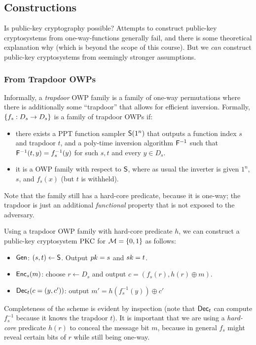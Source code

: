 \documentclass[11pt]{article}
\begin{document}
\subsection{Constructions}
\label{sec:constructions}

Is public-key cryptography possible?  Attempts to construct public-key
cryptosystems from one-way-functions generally fail, and there is some
theoretical explanation why (which is beyond the scope of this
course).  But we \emph{can} construct public-key cryptosystems from
seemingly stronger assumptions.

\subsubsection{From Trapdoor OWPs}
\label{sec:from-trapdoor-owps}

Informally, a \emph{trapdoor} OWP family is a family of one-way
permutations where there is additionally some ``trapdoor'' that allows
for efficient inversion.  Formally, $\{f_{s}: D_{s} \to D_{s}\}$ is a
family of trapdoor OWPs if:
\begin{itemize}
\item there exists a PPT function sampler $\mathsf{S}(1^{n})$ that
  outputs a function index $s$ and trapdoor $t$, and a poly-time
  inversion algorithm $\mathsf{F}^{-1}$ such that $\mathsf{F}^{-1}(t, y) =
  f_{s}^{-1}(y)$ for such $s,t$ and every $y \in D_{s}$.
\item it is a OWP family with respect to $\mathsf{S}$, where as usual
  the inverter is given $1^{n}$, $s$, and $f_{s}(x)$ (but $t$ is
  withheld).
\end{itemize}
Note that the family still has a hard-core predicate, because it is
one-way; the trapdoor is just an additional \emph{functional} property
that is not exposed to the adversary.

Using a trapdoor OWP family with hard-core predicate $h$, we can
construct a public-key cryptosystem $\text{PKC}$ for $\mathcal{M} = \{0,1\}$ as
follows:
\begin{itemize}
\item $\mathsf{Gen}$: $(s, t) \gets \mathsf{S}$.  Output $pk = s$ and $sk =
  t$.
\item $\mathsf{Enc}_{s}(m)$: choose $r \gets D_{s}$ and output $c =
  (f_{s}(r), h(r) \oplus m)$.
\item $\mathsf{Dec}_{t}(c = (y, c'))$: output $m' = h(f_{s}^{-1}(y)) \oplus
  c'$ 
\end{itemize}
Completeness of the scheme is evident by inspection (note that
$\mathsf{Dec}_{t}$ can compute $f_{s}^{-1}$ because it knows the trapdoor
$t$).  It is important that we are using a \emph{hard-core} predicate
$h(r)$ to conceal the message bit $m$, because in general $f_{s}$
might reveal certain bits of $r$ while still being one-way.
\end{document}
